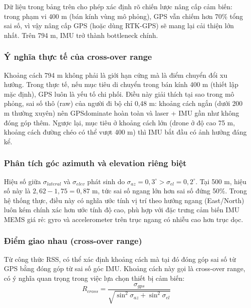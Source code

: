 Dữ liệu trong bảng trên cho phép xác định rõ chiến lược nâng cấp cảm biến: trong phạm vi 400 m (bán kính vùng mô phỏng), GPS vẫn chiếm hơn 70\% tổng sai số, vì vậy nâng cấp GPS (hoặc dùng RTK-GPS) sẽ mang lại cải thiện lớn nhất. Trên 794 m, IMU trở thành bottleneck chính.

\subsubsection{Ý nghĩa thực tế của cross-over range}
\hspace{0.5cm} Khoảng cách 794 m không phải là giới hạn cứng mà là điểm chuyển đổi xu hướng. Trong thực tế, nếu mục tiêu di chuyển trong bán kính 400 m (thiết lập mặc định), GPS luôn là yếu tố chi phối. Điều này giải thích tại sao trong mô phỏng, sai số thô (raw) của người đi bộ chỉ 0,48 m: khoảng cách ngắn (dưới 200 m thường xuyên) nên GPSdominate hoàn toàn và laser + IMU gần như không đóng góp thêm. Ngược lại, mục tiêu ở khoảng cách lớn (drone ở độ cao 75 m, khoảng cách đường chéo có thể vượt 400 m) thì IMU bắt đầu có ảnh hưởng đáng kể.

\subsubsection{Phân tích góc azimuth và elevation riêng biệt}
\hspace{0.5cm} Hiệu số giữa $\sigma_{lateral}$ và $\sigma_{elev}$ phát sinh do $\sigma_{az} = 0{,}3^\circ > \sigma_{el} = 0{,}2^\circ$. Tại 500 m, hiệu số này là $2{,}62 - 1{,}75 = 0{,}87$ m, tức sai số ngang lớn hơn sai số đứng 50\%. Trong hệ thống thực, điều này có nghĩa ước tính vị trí theo hướng ngang (East/North) luôn kém chính xác hơn ước tính độ cao, phù hợp với đặc trưng cảm biến IMU MEMS giá rẻ: gyro và accelerometer trên trục ngang có nhiễu cao hơn trục dọc.

\subsubsection{Điểm giao nhau (cross-over range)}
\hspace{0.5cm} Từ công thức RSS, có thể xác định khoảng cách mà tại đó đóng góp sai số từ GPS bằng đóng góp từ sai số góc IMU. Khoảng cách này gọi là cross-over range, có ý nghĩa quan trọng trong việc lựa chọn thiết bị cảm biến:
\begin{equation}
    R_{cross} = \frac{\sigma_{gps}}{\sqrt{\sin^2\sigma_{az} + \sin^2\sigma_{el}}}
\end{equation}

